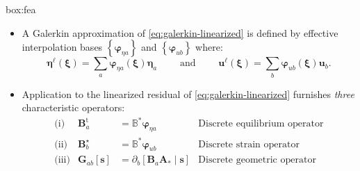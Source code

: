 \begin{ambox}{box:fea}
{\noindent

\begin{itemize}
\item
  A Galerkin approximation of %
  \eqref{eq:galerkin-linearized} is defined by effective interpolation bases 
  \(\left\{\bm{\varphi}^{}_{\eta a}\right\}\) and \(\left\{\bm{\varphi}^{}_{u b}\right\}\) where:
  \begin{equation*}
    \bm{\eta}^\ell(\bm{\xi}) = \sum_a \bm{\varphi}^{}_{\eta a}(\bm{\xi})\bm{\eta}^{}_a
    \qquad\text{ and }\qquad
    \bm{u}^\ell(\bm{\xi}) = \sum_b \bm{\varphi}^{}_{u b}(\bm{\xi}) \bm{u}^{}_b.
  \end{equation*}

\item
  Application to the linearized residual of \eqref{eq:galerkin-linearized} furnishes \emph{three} characteristic operators:
  \begin{equation*}
  \begin{array}{lrll}
    \text{(i)}  &\bm{B}_a^{\mathrm{t}}     & = \mathbb{B}^*\bm{\varphi}^{}_{\eta a} & \text{Discrete equilibrium operator} \\[2ex]
    \text{(ii)} &\bm{B}^{\star}_b          & = \mathbb{B}^*\bm{\varphi}^{}_{u b}         & \text{Discrete strain operator} \\[2ex]
    \text{(iii)}&\bm{G}_{ab}[\bm{s}] & = \partial_b\left[\bm{B}_a\bm{A}_*\mid\bm{s}\right]%
    & \text{Discrete geometric operator} \\[2ex]
  \end{array}
  \end{equation*}

\end{itemize}}
\end{ambox}
